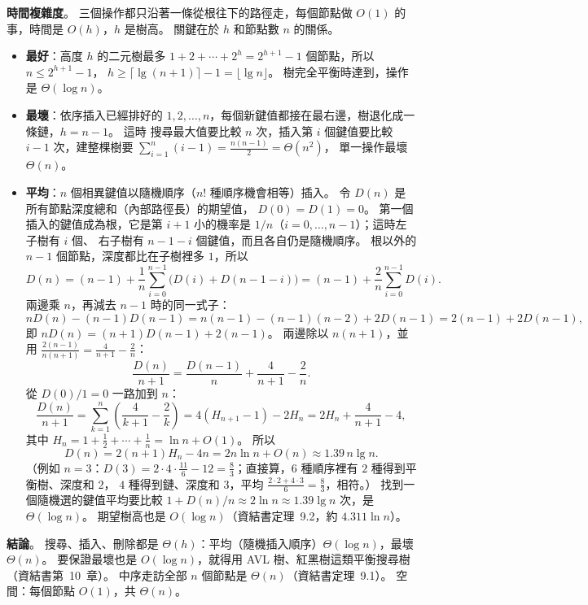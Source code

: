 \begin{pastsoln}
\textbf{時間複雜度}。 三個操作都只沿著一條從根往下的路徑走，每個節點做 $O(1)$ 的事，時間是 $O(h)$，$h$ 是樹高。
關鍵在於 $h$ 和節點數 $n$ 的關係。
\begin{itemize}
\item \textbf{最好}：高度 $h$ 的二元樹最多 $1 + 2 + \cdots + 2^h = 2^{h+1} - 1$ 個節點，所以 $n \le 2^{h+1} - 1$，
$h \ge \lceil \lg(n + 1) \rceil - 1 = \lfloor \lg n \rfloor$。 樹完全平衡時達到，操作是 $\Theta(\log n)$。
\item \textbf{最壞}：依序插入已經排好的 $1, 2, \ldots, n$，每個新鍵值都接在最右邊，樹退化成一條鏈，$h = n - 1$。 這時
搜尋最大值要比較 $n$ 次，插入第 $i$ 個鍵值要比較 $i - 1$ 次，建整棵樹要 $\sum_{i=1}^{n} (i - 1) = \frac{n(n - 1)}{2} = \Theta(n^2)$，
單一操作最壞 $\Theta(n)$。
\item \textbf{平均}：$n$ 個相異鍵值以隨機順序（$n!$ 種順序機會相等）插入。 令 $D(n)$ 是所有節點深度總和（內部路徑長）的期望值，
$D(0) = D(1) = 0$。 第一個插入的鍵值成為根，它是第 $i + 1$ 小的機率是 $1/n$（$i = 0, \ldots, n - 1$）；這時左子樹有 $i$ 個、
右子樹有 $n - 1 - i$ 個鍵值，而且各自仍是隨機順序。 根以外的 $n - 1$ 個節點，深度都比在子樹裡多 $1$，所以
\[
D(n) = (n - 1) + \frac{1}{n} \sum_{i=0}^{n-1} \bigl(D(i) + D(n - 1 - i)\bigr) = (n - 1) + \frac{2}{n} \sum_{i=0}^{n-1} D(i).
\]
兩邊乘 $n$，再減去 $n - 1$ 時的同一式子：
\[
nD(n) - (n - 1)D(n - 1) = n(n - 1) - (n - 1)(n - 2) + 2D(n - 1) = 2(n - 1) + 2D(n - 1),
\]
即 $nD(n) = (n + 1)D(n - 1) + 2(n - 1)$。 兩邊除以 $n(n + 1)$，並用 $\frac{2(n-1)}{n(n+1)} = \frac{4}{n+1} - \frac{2}{n}$：
\[
\frac{D(n)}{n + 1} = \frac{D(n - 1)}{n} + \frac{4}{n + 1} - \frac{2}{n}.
\]
從 $D(0)/1 = 0$ 一路加到 $n$：
\[
\frac{D(n)}{n + 1} = \sum_{k=1}^{n} \left(\frac{4}{k + 1} - \frac{2}{k}\right) = 4\left(H_{n+1} - 1\right) - 2H_n = 2H_n + \frac{4}{n + 1} - 4,
\]
其中 $H_n = 1 + \frac{1}{2} + \cdots + \frac{1}{n} = \ln n + O(1)$。 所以
\[
D(n) = 2(n + 1)H_n - 4n = 2n \ln n + O(n) \approx 1.39\, n \lg n .
\]
（例如 $n = 3$：$D(3) = 2 \cdot 4 \cdot \frac{11}{6} - 12 = \frac{8}{3}$；直接算，$6$ 種順序裡有 $2$ 種得到平衡樹、深度和 $2$，
$4$ 種得到鏈、深度和 $3$，平均 $\frac{2 \cdot 2 + 4 \cdot 3}{6} = \frac{8}{3}$，相符。） 找到一個隨機選的鍵值平均要比較
$1 + D(n)/n \approx 2\ln n \approx 1.39 \lg n$ 次，是 $\Theta(\log n)$。 期望樹高也是 $O(\log n)$（資結書定理~9.2，約
$4.311 \ln n$）。
\end{itemize}

\textbf{結論}。 搜尋、插入、刪除都是 $\Theta(h)$：平均（隨機插入順序）$\Theta(\log n)$，最壞 $\Theta(n)$。 要保證最壞也是
$O(\log n)$，就得用 AVL 樹、紅黑樹這類平衡搜尋樹（資結書第~10~章）。 中序走訪全部 $n$ 個節點是 $\Theta(n)$（資結書定理~9.1）。
空間：每個節點 $O(1)$，共 $\Theta(n)$。
\end{pastsoln}
